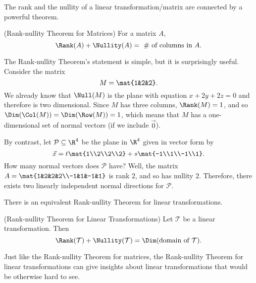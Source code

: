 
The rank and the nullity of a linear transformation/matrix are connected by a powerful theorem.

\begin{theorem}(Rank-nullity Theorem for Matrices) For a matrix $A$,
\[
	\Rank(A)+\Nullity(A)=\ \#\text{ of columns in $A$}.
\]
\end{theorem}

The Rank-nullity Theorem's statement is simple, but it is surprisingly useful. Consider
the matrix \[M=\mat{1&2&2}.\] We already know that $\Null(M)$ is the plane with equation
$x+2y+2z=0$ and therefore is two dimensional. Since $M$ has three columns, $\Rank(M)=1$, and
so $\Dim(\Col(M))=\Dim(\Row(M))=1$, which means that $M$ has a one-dimensional set of normal vectors 
(if we include $\vec 0$).

By contrast, let $\mathcal P\subseteq \R^4$ be the plane in $\R^4$ given in vector form by
\[
	\vec x=t\mat{1\\2\\2\\2}+s\mat{-1\\1\\-1\\1}.
\]
How many normal vectors does $\mathcal P$ have? Well, the matrix $A=\mat{1&2&2&2\\-1&1&-1&1}$ is rank $2$,
and so has nullity $2$. Therefore, there exists two linearly independent normal directions for $\mathcal P$.

\medskip
There is an equivalent Rank-nullity Theorem for linear transformations.
\begin{theorem}(Rank-nullity Theorem for Linear Transformations) Let $\mathcal T$ be a linear transformation.
Then
\[
	\Rank(\mathcal T)+\Nullity(\mathcal T)=\Dim(\text{domain of $\mathcal T$}).
\]
\end{theorem}

Just like the Rank-nullity Theorem for matrices, the Rank-nullity Theorem for linear transformations
can give insights about linear transformations that would be otherwise hard to see.

